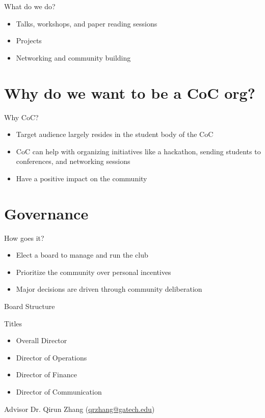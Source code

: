 \documentclass{beamer}
\begin{document}
\begin{frame}{What do we do?}
  \begin{itemize}
  \item Talks, workshops, and paper reading sessions
  \item Projects
  \item Networking and community building
  \end{itemize}
\end{frame}

\section{Why do we want to be a CoC org?}

\begin{frame}{Why CoC?}
  \begin{itemize}
  \item Target audience largely resides in the student body of the CoC
  \item CoC can help with organizing initiatives like a hackathon, sending students to conferences, and networking sessions
  \item Have a positive impact on the community
  \end{itemize}
\end{frame}

\section{Governance}

\begin{frame}{How goes it?}
  \begin{itemize}
  \item Elect a board to manage and run the club
  \item Prioritize the community over personal incentives
  \item Major decisions are driven through community deliberation
  \end{itemize}
\end{frame}

\begin{frame}{Board Structure}
  \begin{block}{Titles}
    \begin{itemize}
    \item Overall Director
    \item Director of Operations
    \item Director of Finance
    \item Director of Communication
    \end{itemize}
  \end{block}

  \begin{block}{Advisor}
    Dr. Qirun Zhang (\href{mailto://qrzhang@gatech.edu}{qrzhang@gatech.edu})
  \end{block}
\end{frame}
\end{document}
